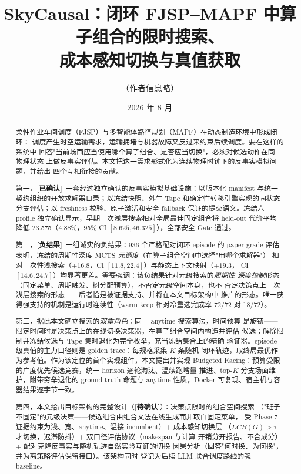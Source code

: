 \documentclass[11pt,a4paper]{article}
\title{
    SkyCausal：闭环 FJSP--MAPF 中算子组合的限时搜索、\\
    成本感知切换与真值获取
}
\author{（作者信息略）}
\date{2026 年 8 月}
\newcommand{\racing}{Budgeted Racing}
\newcommand{\confirmed}{\textcolor{green!45!black}{\textbf{[已确认]}}}
\newcommand{\pending}{\textcolor{red!70!black}{\textbf{[待确认]}}}
\newcommand{\negative}{\textcolor{red!70!black}{\textbf{[负结果]}}}
\begin{document}
\maketitle

\begin{abstract}
柔性作业车间调度（FJSP）与多智能体路径规划（MAPF）在动态制造环境中形成闭环：
调度产生时空运输需求，运输拥堵与机器故障又反过来约束后续调度。要在这样的系统中
回答"当前场面应当使用哪个算子组合、是否应当切换"，必须对候选动作在同一物理状态
上做反事实评估。本文把这一需求形式化为连续物理时钟下的反事实模拟问题，并给出
四个互相衔接的贡献。

第一，\confirmed\ 一套经过独立确认的反事实模拟基础设施：以版本化 manifest 与统一
契约组织的开放求解器目录；以冻结快照、外生 Tape 和确定性转移引擎实现的同状态
分支评估；以 freshness 校验、原子激活和安全 fallback 保证的提交语义。冻结六
profile 独立确认显示，早期一次浅层搜索相对全局最佳固定组合将 held-out 代价平均
降低 23.575（4.88\%，95\% CI $[8.625, 46.325]$），全部安全 Gate 通过。

第二，\negative\ 一组诚实的负结果：936 个严格配对闭环 episode 的 paper-grade 评估
表明，冻结的周期性深度 MCTS \emph{元调度}（在算子组合空间中选择"用哪个求解器"）
相对一次性浅搜索（$+16.8$，CI $[11.8,22.4]$）与静态上下文映射（$+19.3$，
CI $[14.6,24.7]$）均显著更差。需要强调：该负结果针对元级搜索的\emph{周期性
深度控制}形态（固定菜单、周期触发、树分配预算），不否定元级空间本身，也不
否定决策点上一次浅层搜索的形态——后者恰是被证据支持、并将在本文目标架构中
推广的形态。唯一获得强支持的机制是运行时连续性（warm keep 相对冷重选完成率
72/72 对 18/72）。

第三，据此本文确立搜索的\emph{双重角色}：同一 anytime 搜索算法，时间预算
是旋钮——限定时间时是决策点上的在线切换决策器，在算子组合空间内构造并评估
候选；解除限制并冻结候选与 Tape 集时退化为完全枚举，充当冻结集合上的精确
验证器。episode 级真值的主力口径则是 golden trace：每规格采集 $K$ 条随机
闭环轨迹，取终局最优作为参考值。作为该定位的首个实现组件，本文提出并实现
\racing{}：预算受限的广度优先候选竞赛，统一 horizon 逐轮淘汰、温续跑增量
推进、top-$K$ 分支场面维护，附带穷举退化的 ground truth 命题与 anytime
性质，Docker 可复现、宿主机与容器结果逐字节一致。

第四，本文给出目标架构的完整设计（\pending）：决策点限时的组合空间搜索
（"班子不固定"的元级决策——候选组合由组合文法在线生成而非取自固定菜单，
受 Phase 7 证据约束为浅、宽、anytime、温接 incumbent）+ 成本感知切换层
（$LCB(G) > \tau$ 才切换，迟滞防抖）+ 双口径评估协议（makespan 与计算
开销分开报告、不合成分）+ 配对克隆反事实与随机轨迹自然实验互证的切换
因果分析（回答"何时换、为何换"，并为离策略评估保留接口）。该架构同时
登记为后续 LLM 联合调度路线的强 baseline。
\end{abstract}
\end{document}
